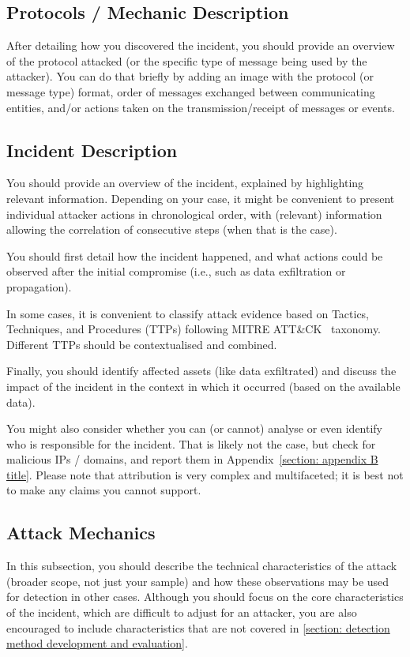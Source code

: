 \subsection{Protocols / Mechanic Description}

After detailing how you discovered the incident, you should provide an overview of the protocol attacked (or the specific type of message being used by the attacker). You can do that briefly by adding an image with the protocol (or message type) format, order of messages exchanged between communicating entities, and/or actions taken on the transmission/receipt of messages or events.

\subsection{Incident Description}

You should provide an overview of the incident, explained by highlighting relevant information. Depending on your case, it might be convenient to present individual attacker actions in chronological order, with (relevant) information allowing the correlation of consecutive steps (when that is the case).

You should first detail how the incident happened, and what actions could be observed after the initial compromise (i.e., such as data exfiltration or propagation). 

In some cases, it is convenient to classify attack evidence based on Tactics, Techniques, and Procedures (TTPs) following MITRE ATT\&CK~\cite{attack} taxonomy. Different TTPs should be contextualised and combined. 

Finally, you should identify affected assets (like data exfiltrated) and discuss the impact of the incident in the context in which it occurred (based on the available data).

You might also consider whether you can (or cannot) analyse or even identify who is responsible for the incident. That is likely not the case, but check for malicious IPs / domains, and report them in Appendix~\ref{section: appendix B title}. Please note that attribution is very complex and multifaceted; it is best not to make any claims you cannot support.

\subsection{Attack Mechanics}

In this subsection, you should describe the technical characteristics of the attack (broader scope, not just your sample) and how these observations may be used for detection in other cases. Although you should focus on the core characteristics of the incident, which are difficult to adjust for an attacker, you are also encouraged to include characteristics that are not covered in \cref{section: detection method development and evaluation}.

